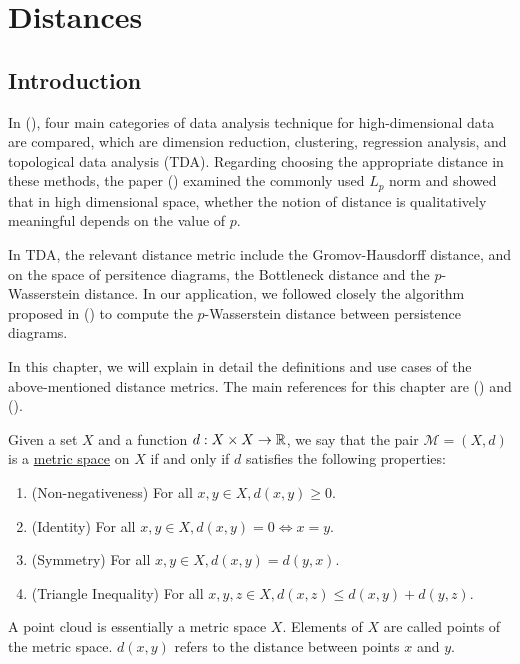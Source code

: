 \chapter{Distances} 
\label{chapter4-distances}

\section{Introduction}

In (\cite{memoli_comparing_2004}), four main categories of data analysis technique for high-dimensional data are compared, which are dimension reduction, clustering, regression analysis, and topological data analysis (TDA). Regarding choosing the appropriate distance in these methods, the paper (\cite{goos_surprising_2001}) examined the commonly used $L_p$ norm and showed that in high dimensional space, whether the notion of distance is qualitatively meaningful depends on the value of $p$.

In TDA, the relevant distance metric include the Gromov-Hausdorff distance, and on the space of persitence diagrams, the Bottleneck distance and the $p$-Wasserstein distance. In our application, we  followed closely the algorithm proposed in (\cite{kerber_geometry_2016}) to compute the $p$-Wasserstein distance between persistence diagrams. 

In this chapter, we will explain in detail the definitions and use cases of the above-mentioned distance metrics. The main references for this chapter are (\cite{chazal_introduction_2021}) and (\cite{phillips_notes}).

\begin{defn}
Given a set $X$ and a function $d: X \times X \to \mathbb R$, we say that the pair $\mathcal{M} = (X,d)$ is a \underline{metric space} on $X$ if and only if $d$ satisfies the following properties:

\begin{enumerate}
\item (Non-negativeness) For all $ x, y \in X, d (x, y) \geq 0.$
    \item (Identity) For all $ x, y \in X, d(x, y) = 0 \iff x = y.$
    \item (Symmetry) For all $x,y\in X, d(x, y) = d(y, x).$
    \item (Triangle Inequality) For all $x,y,z\in X, d(x, z) \leq d(x, y) + d(y, z)$.
\end{enumerate}

A point cloud is essentially a metric space $X$. Elements of $X$ are called points of the metric space. $d(x, y)$ refers to the distance between points $x$ and $y$. 
\end{defn}

